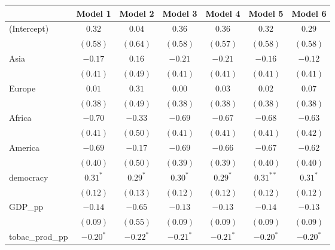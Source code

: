 
\begin{table}[!h]
\begin{center}
\begin{tabular}{l c c c c c c }
\toprule
 & Model 1 & Model 2 & Model 3 & Model 4 & Model 5 & Model 6 \\
\midrule
(Intercept)             & $0.32$       & $0.04$       & $0.36$       & $0.36$       & $0.32$       & $0.29$       \\
                        & $(0.58)$     & $(0.64)$     & $(0.58)$     & $(0.57)$     & $(0.58)$     & $(0.58)$     \\
Asia                    & $-0.17$      & $0.16$       & $-0.21$      & $-0.21$      & $-0.16$      & $-0.12$      \\
                        & $(0.41)$     & $(0.49)$     & $(0.41)$     & $(0.41)$     & $(0.41)$     & $(0.41)$     \\
Europe                  & $0.01$       & $0.31$       & $0.00$       & $0.03$       & $0.02$       & $0.07$       \\
                        & $(0.38)$     & $(0.49)$     & $(0.38)$     & $(0.38)$     & $(0.38)$     & $(0.38)$     \\
Africa                  & $-0.70$      & $-0.33$      & $-0.69$      & $-0.67$      & $-0.68$      & $-0.63$      \\
                        & $(0.41)$     & $(0.50)$     & $(0.41)$     & $(0.41)$     & $(0.41)$     & $(0.42)$     \\
America                 & $-0.69$      & $-0.17$      & $-0.69$      & $-0.66$      & $-0.67$      & $-0.62$      \\
                        & $(0.40)$     & $(0.50)$     & $(0.39)$     & $(0.39)$     & $(0.40)$     & $(0.40)$     \\
democracy               & $0.31^{*}$   & $0.29^{*}$   & $0.30^{*}$   & $0.29^{*}$   & $0.31^{**}$  & $0.31^{*}$   \\
                        & $(0.12)$     & $(0.13)$     & $(0.12)$     & $(0.12)$     & $(0.12)$     & $(0.12)$     \\
GDP\_pp                 & $-0.14$      & $-0.65$      & $-0.13$      & $-0.13$      & $-0.14$      & $-0.13$      \\
                        & $(0.09)$     & $(0.55)$     & $(0.09)$     & $(0.09)$     & $(0.09)$     & $(0.09)$     \\
tobac\_prod\_pp         & $-0.20^{*}$  & $-0.22^{*}$  & $-0.21^{*}$  & $-0.21^{*}$  & $-0.20^{*}$  & $-0.20^{*}$  \\

\end{tabular}
\end{center}
\end{table}
